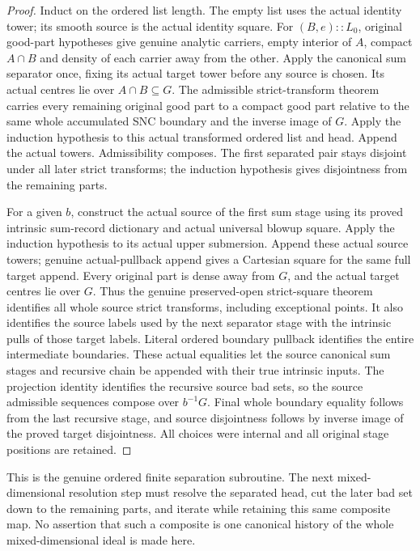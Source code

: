 \begin{proof}
Induct on the ordered list length. The empty list uses the actual
identity tower; its smooth source is the actual identity square.
For $(B,e)::L_0$, original good-part hypotheses give genuine analytic
carriers, empty interior of $A$, compact $A\cap B$ and density of
each carrier away from the other. Apply the canonical sum separator
once, fixing its actual target tower before any source is chosen.
Its actual centres lie over $A\cap B\subseteq G$. The admissible
strict-transform theorem carries every remaining original good part
to a compact good part relative to the same whole accumulated SNC
boundary and the inverse image of $G$. Apply the induction hypothesis
to this actual transformed ordered list and head. Append the actual
towers. Admissibility composes. The first separated pair stays
disjoint under all later strict transforms; the induction hypothesis
gives disjointness from the remaining parts.

For a given $b$, construct the actual source of the first sum stage
using its proved intrinsic sum-record dictionary and actual universal
blowup square. Apply the induction hypothesis to its actual upper
submersion. Append these actual source towers; genuine actual-pullback
append gives a Cartesian square for the same full target append.
Every original part is dense away from $G$, and the actual target
centres lie over $G$. Thus the genuine preserved-open strict-square
theorem identifies all whole source strict transforms, including
exceptional points. It also identifies the source labels used by
the next separator stage with the intrinsic pulls of those target
labels. Literal ordered boundary pullback identifies the entire
intermediate boundaries. These actual equalities let the source
canonical sum stages and recursive chain be appended with their true
intrinsic inputs. The projection identity identifies the recursive
source bad sets, so the source admissible sequences compose over
$b^{-1}G$. Final whole boundary equality follows from the last
recursive stage, and source disjointness follows by inverse image
of the proved target disjointness. All choices were internal and
all original stage positions are retained.
\end{proof}

\begin{remark}
This is the genuine ordered finite separation subroutine. The next
mixed-dimensional resolution step must resolve the separated head,
cut the later bad set down to the remaining parts, and iterate while
retaining this same composite map. No assertion that such a composite
is one canonical history of the whole mixed-dimensional ideal is
made here.
\end{remark}
